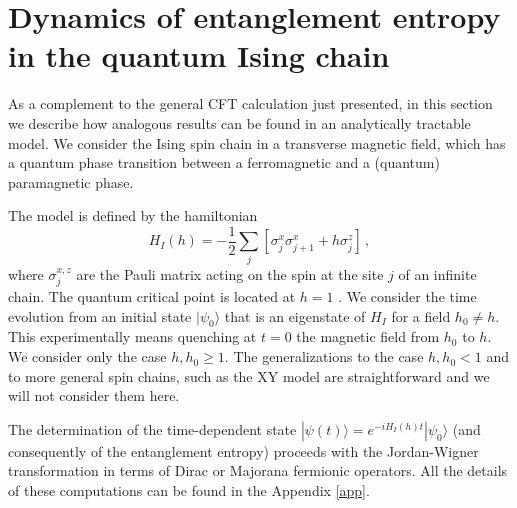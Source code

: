\documentclass[12pt,preprint,tighten,eqsecnum,aps,floats,psfig,epsfig,amsmath,onecolumn]{revtex4-1}
\def\be{\begin{equation}}
\def\ee{\end{equation}}
\def\s{\sigma}
\begin{document}
\section{Dynamics of entanglement entropy in the quantum Ising chain}
\label{secIs}

As a complement to the general CFT calculation just presented, in this
section we describe how analogous results can be found in an analytically 
tractable model. We consider the Ising spin chain in a transverse 
magnetic field, which has a quantum phase transition between a ferromagnetic
and a (quantum) paramagnetic phase.

The model is defined by the hamiltonian
\be
H_I(h)=-\frac{1}{2}\sum_j [\s^x_j\s^x_{j+1}+ h \s^z_j]\,,
\label{HI}
\ee
where $\sigma^{x,z}_j$ are the Pauli matrix acting on the spin at the site 
$j$ of an infinite chain. The quantum critical point is located 
at $h=1$ \cite{sach}. 
We consider the time evolution from an initial state $|\psi_0\rangle$ 
that is an eigenstate of $H_I$ for a field $h_0\neq h$. 
This experimentally means quenching at $t=0$ the magnetic field from $h_0$ 
to $h$. We consider only the case $h,h_0\geq 1$. 
The generalizations to the case $h,h_0<1$ and to more general spin chains, 
such as the XY model \cite{sach} are straightforward and we will not 
consider them here.

The determination of the time-dependent state 
$|\psi(t)\rangle=e^{-i H_I(h) t}|\psi_0\rangle$ (and consequently of the 
entanglement entropy) proceeds with the Jordan-Wigner transformation in terms
of Dirac or Majorana fermionic operators. 
All the details of these computations can be found in the Appendix \ref{app}.
\end{document}
